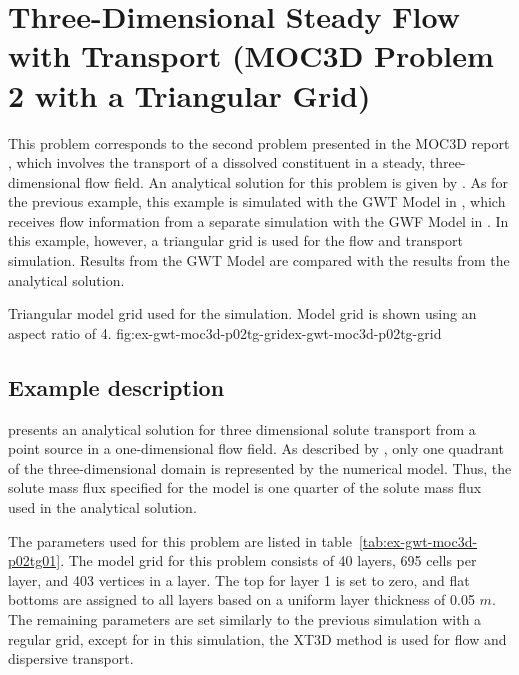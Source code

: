 \section{Three-Dimensional Steady Flow with Transport (MOC3D Problem 2 with a Triangular Grid)}

This problem corresponds to the second problem presented in the MOC3D report \cite{konikow1996three}, which involves the transport of a dissolved constituent in a steady, three-dimensional flow field.  An analytical solution for this problem is given by \cite{wexler1992}.  As for the previous example, this example is simulated with the GWT Model in \mf, which receives flow information from a separate simulation with the GWF Model in \mf.  In this example, however, a triangular grid is used for the flow and transport simulation.  Results from the GWT Model are compared with the results from the \cite{wexler1992} analytical solution.

\begin{StandardFigure}{
                                     Triangular model grid used for the \mf simulation.  Model grid is shown using an aspect ratio of 4.
                                     }{fig:ex-gwt-moc3d-p02tg-grid}{ex-gwt-moc3d-p02tg-grid}
\end{StandardFigure}            


\subsection{Example description}

\cite{wexler1992} presents an analytical solution for three dimensional solute transport from a point source in a one-dimensional flow field.  As described by \cite{konikow1996three}, only one quadrant of the three-dimensional domain is represented by the numerical model.  Thus, the solute mass flux specified for the model is one quarter of the solute mass flux used in the analytical solution.  

The parameters used for this problem are listed in table~\ref{tab:ex-gwt-moc3d-p02tg01}.  The model grid for this problem consists of 40 layers, 695 cells per layer, and 403 vertices in a layer.  The top for layer 1 is set to zero, and flat bottoms are assigned to all layers based on a uniform layer thickness of 0.05 $m$.  The remaining parameters are set similarly to the previous simulation with a regular grid, except for in this simulation, the XT3D method is used for flow and dispersive transport.

